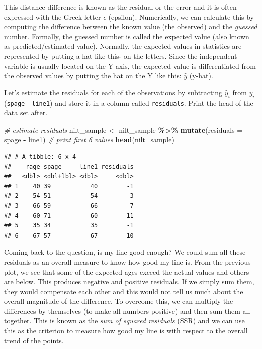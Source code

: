 \documentclass[
]{book}
\newenvironment{Shaded}{\begin{snugshade}}{\end{snugshade}}
\newcommand{\AttributeTok}[1]{\textcolor[rgb]{0.13,0.29,0.53}{#1}}
\newcommand{\CommentTok}[1]{\textcolor[rgb]{0.56,0.35,0.01}{\textit{#1}}}
\newcommand{\FunctionTok}[1]{\textcolor[rgb]{0.13,0.29,0.53}{\textbf{#1}}}
\newcommand{\NormalTok}[1]{#1}
\newcommand{\OtherTok}[1]{\textcolor[rgb]{0.56,0.35,0.01}{#1}}
\newcommand{\SpecialCharTok}[1]{\textcolor[rgb]{0.81,0.36,0.00}{\textbf{#1}}}
\begin{document}
This distance difference is known as the residual or the error and it is often expressed with the Greek letter \(\epsilon\) (epsilon). Numerically, we can calculate this by computing the difference between the known value (the observed) and the \emph{guessed} number. Formally, the guessed number is called the expected value (also known as predicted/estimated value). Normally, the expected values in statistics are represented by putting a hat like this \(\hat{}\) on the letters. Since the independent variable is usually located on the Y axis, the expected value is differentiated from the observed values by putting the hat on the Y like this: \(\hat{y}\) (y-hat).

Let's estimate the residuals for each of the observations by subtracting \(\hat{y}_i\) from \(y_i\) (\texttt{spage} - \texttt{line1}) and store it in a column called \texttt{residuals}. Print the head of the data set after.

\begin{Shaded}
\begin{Highlighting}[]
\CommentTok{\# estimate residuals}
\NormalTok{nilt\_sample }\OtherTok{\textless{}{-}}\NormalTok{ nilt\_sample }\SpecialCharTok{\%\textgreater{}\%} 
  \FunctionTok{mutate}\NormalTok{(}\AttributeTok{residuals =}\NormalTok{ spage }\SpecialCharTok{{-}}\NormalTok{ line1)}
\CommentTok{\# print first 6 values}
\FunctionTok{head}\NormalTok{(nilt\_sample)}
\end{Highlighting}
\end{Shaded}

\begin{verbatim}
## # A tibble: 6 x 4
##    rage spage     line1 residuals
##   <dbl> <dbl+lbl> <dbl>     <dbl>
## 1    40 39           40        -1
## 2    54 51           54        -3
## 3    66 59           66        -7
## 4    60 71           60        11
## 5    35 34           35        -1
## 6    67 57           67       -10
\end{verbatim}

Coming back to the question, is my line good enough? We could sum all these residuals as an overall measure to know how good my line is. From the previous plot, we see that some of the expected ages exceed the actual values and others are below. This produces negative and positive residuals. If we simply sum them, they would compensate each other and this would not tell us much about the overall magnitude of the difference. To overcome this, we can multiply the differences by themselves (to make all numbers positive) and then sum them all together. This is known as the \emph{sum of squared residuals} (SSR) and we can use this as the criterion to measure how good my line is with respect to the overall trend of the points.
\end{document}
